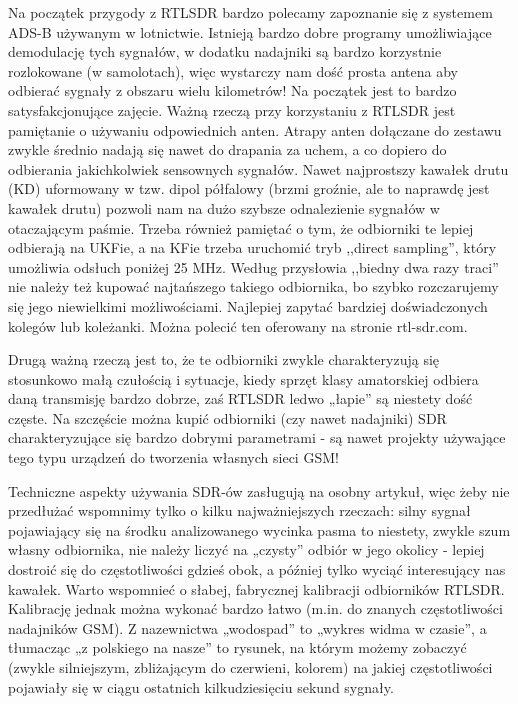 \documentclass[a4paper,12pt]{article}
\begin{document}
Na początek przygody z RTLSDR bardzo polecamy zapoznanie się z systemem ADS-B używanym w lotnictwie. Istnieją bardzo dobre programy umożliwiające demodulację tych sygnałów, w dodatku nadajniki są bardzo korzystnie rozlokowane (w samolotach), więc wystarczy nam dość prosta antena aby odbierać sygnały z obszaru wielu kilometrów! Na początek jest to bardzo satysfakcjonujące zajęcie.
Ważną rzeczą przy korzystaniu z RTLSDR jest pamiętanie o używaniu odpowiednich anten. Atrapy anten dołączane do zestawu zwykle średnio nadają się nawet do drapania za uchem, a co dopiero do odbierania jakichkolwiek sensownych sygnałów. Nawet najprostszy kawałek drutu (KD) uformowany w tzw. dipol półfalowy (brzmi groźnie, ale to naprawdę jest kawałek drutu) pozwoli nam na dużo szybsze odnalezienie sygnałów w otaczającym paśmie.
Trzeba również pamiętać o tym, że odbiorniki te lepiej odbierają na UKFie, a na KFie trzeba uruchomić tryb ,,direct sampling'', który umożliwia odsłuch poniżej 25 MHz.
Według przysłowia ,,biedny dwa razy traci'' nie należy też kupować najtańszego takiego odbiornika, bo szybko rozczarujemy się jego niewielkimi możliwościami. Najlepiej zapytać bardziej doświadczonych kolegów lub koleżanki.
Można polecić ten oferowany na stronie rtl-sdr.com. 

Drugą ważną rzeczą jest to, że te odbiorniki zwykle charakteryzują się stosunkowo małą czułością i sytuacje, kiedy sprzęt klasy amatorskiej odbiera daną transmisję bardzo dobrze, zaś RTLSDR ledwo „łapie” są niestety dość częste. Na szczęście można kupić odbiorniki (czy nawet nadajniki) SDR charakteryzujące się bardzo dobrymi parametrami - są nawet projekty używające tego typu urządzeń do tworzenia własnych sieci GSM!

Techniczne aspekty używania SDR-ów zasługują na osobny artykuł, więc żeby nie przedłużać wspomnimy tylko o kilku najważniejszych rzeczach: silny sygnał pojawiający się na środku analizowanego wycinka pasma to niestety, zwykle szum własny odbiornika, nie należy liczyć na „czysty” odbiór w jego okolicy - lepiej dostroić się do częstotliwości gdzieś obok, a później tylko wyciąć interesujący nas kawałek. Warto wspomnieć o słabej, fabrycznej kalibracji odbiorników RTLSDR. Kalibrację jednak można wykonać bardzo łatwo (m.in. do znanych częstotliwości nadajników GSM).
Z nazewnictwa „wodospad” to „wykres widma w czasie”, a tłumacząc „z polskiego na nasze” to rysunek, na którym możemy zobaczyć (zwykle silniejszym, zbliżającym do czerwieni, kolorem) na jakiej częstotliwości pojawiały się w ciągu ostatnich kilkudziesięciu sekund sygnały.
\end{document}
